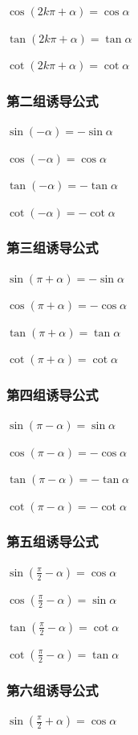 \documentclass[UTF8]{ctexbook}
\begin{document}
{{{{    $\cos{(2k\pi + \alpha)} = \cos{\alpha}$

    $\tan(2k\pi + \alpha) = \tan\alpha$

    $\cot(2k\pi + \alpha) = \cot\alpha$
  }%

  \subsubsection{第二组诱导公式}{
    $\sin(-\alpha) = -\sin\alpha$

    $\cos(-\alpha) = \cos\alpha$

    $\tan(-\alpha) = -\tan\alpha$

    $\cot(-\alpha) = -\cot\alpha$
  }%

  \subsubsection{第三组诱导公式}{
    $\sin(\pi + \alpha) = -\sin\alpha$

    $\cos(\pi + \alpha) = -\cos\alpha$

    $\tan(\pi + \alpha) = \tan\alpha$

    $\cot(\pi + \alpha) = \cot\alpha$
  }%

  \subsubsection{第四组诱导公式}{
    $\sin(\pi - \alpha) = \sin\alpha$

    $\cos(\pi - \alpha) = -\cos\alpha$

    $\tan(\pi - \alpha) = -\tan\alpha$

    $\cot(\pi - \alpha) = -\cot\alpha$
  }%

  \subsubsection{第五组诱导公式}{
    $\sin(\frac{\pi}{2} - \alpha) = \cos\alpha$

    $\cos(\frac{\pi}{2} - \alpha) = \sin\alpha$

    $\tan(\frac{\pi}{2} - \alpha) = \cot\alpha$

    $\cot(\frac{\pi}{2} - \alpha) = \tan\alpha$
  }%

  \subsubsection{第六组诱导公式}{
    $\sin(\frac{\pi}{2} + \alpha) = \cos\alpha$

}}}}
\end{document}
